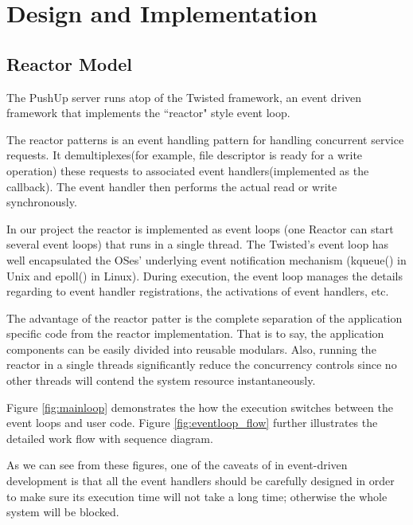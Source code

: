 \section {Design and Implementation\\}

\subsection{Reactor Model\\}
The PushUp server runs atop of the Twisted framework\cite{Twisted}, an 
event driven framework that implements the ``reactor" style event loop.

The reactor patterns is an event handling pattern for handling concurrent
service requests. It demultiplexes(for example, file descriptor is 
ready for a write operation) these requests to associated event
handlers(implemented as the callback). The event handler then performs
the actual read or write synchronously.

In our project the reactor is implemented as event loops (one Reactor 
can start several event loops) that runs in a single thread. The
Twisted's event loop has well encapsulated the OSes' underlying 
event notification mechanism (kqueue() in Unix and epoll() in Linux).
During execution, the event loop manages the details regarding to
event handler registrations, the activations of event handlers, etc.

The advantage of the reactor patter is the complete separation of the 
application specific code from the reactor implementation. That is to
say, the application components can be easily divided into reusable 
modulars. Also, running the reactor in a single threads significantly
reduce the concurrency controls since no other threads will contend 
the system resource instantaneously.

Figure \ref{fig:mainloop} demonstrates the how the execution switches
between the event loops and user code. Figure \ref{fig:eventloop_flow} 
further illustrates the detailed work flow with sequence diagram.

As we can see from these figures, one of the caveats of in 
event-driven development is that all the event handlers should 
be carefully designed in order to make sure its execution time 
will not take a long time; otherwise the whole system will 
be blocked.

